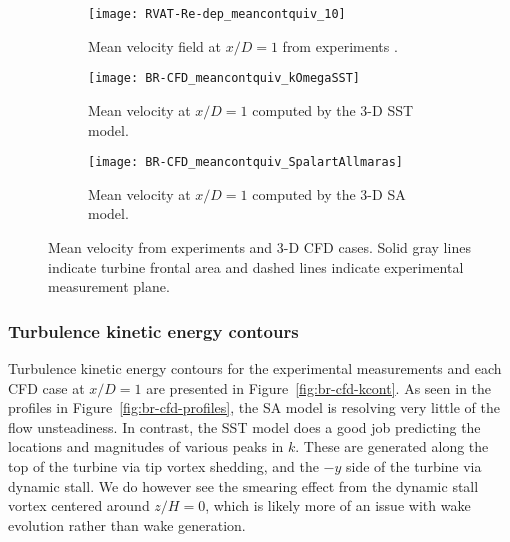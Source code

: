 \begin{figure}
    \centering
    \begin{subfigure}[b]{\textwidth}
       \centering

        \texttt{[image: RVAT-Re-dep\_meancontquiv\_10]}

       \caption{Mean velocity field at $x/D=1$ from experiments
           \cite{Bachant2016-RVAT-Re-dep}.}

       \label{fig:br-cfd-meancontquiv-exp}
   \end{subfigure}

   \begin{subfigure}[b]{\textwidth}
       \centering

        \texttt{[image: BR-CFD\_meancontquiv\_kOmegaSST]}

       \caption{Mean velocity at $x/D=1$ computed by the 3-D SST model.}

       \label{fig:meancontquiv-SST}
   \end{subfigure}

   \begin{subfigure}[b]{\textwidth}
       \centering

        \texttt{[image: BR-CFD\_meancontquiv\_SpalartAllmaras]}

       \caption{Mean velocity at $x/D=1$ computed by the 3-D SA model.}

       \label{fig:meancontquiv-SA}
   \end{subfigure}

    \caption{Mean velocity from experiments and 3-D CFD cases. Solid gray lines
        indicate turbine frontal area and dashed lines indicate experimental
        measurement plane.}

    \label{fig:br-cfd-mean-velocity}
\end{figure}


\subsubsection{Turbulence kinetic energy contours}

Turbulence kinetic energy contours for the experimental measurements and each
CFD case at $x/D=1$ are presented in Figure~\ref{fig:br-cfd-kcont}. As seen in
the profiles in Figure~\ref{fig:br-cfd-profiles}, the SA model is resolving very
little of the flow unsteadiness. In contrast, the SST model does a good job
predicting the locations and magnitudes of various peaks in $k$. These are
generated along the top of the turbine via tip vortex shedding, and the $-y$
side of the turbine via dynamic stall. We do however see the smearing effect
from the dynamic stall vortex centered around $z/H=0$, which is likely more of
an issue with wake evolution rather than wake generation.

